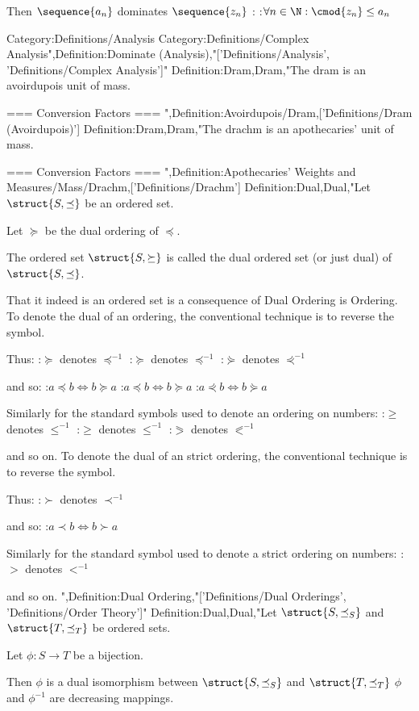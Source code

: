 Then $\sequence {a_n}$ dominates $\sequence {z_n}$ :
:$\forall n \in \N: \cmod {z_n} \le a_n$

Category:Definitions/Analysis
Category:Definitions/Complex Analysis",Definition:Dominate (Analysis),"['Definitions/Analysis', 'Definitions/Complex Analysis']"
Definition:Dram,Dram,"The dram is an avoirdupois unit of mass.

=== Conversion Factors ===
",Definition:Avoirdupois/Dram,['Definitions/Dram (Avoirdupois)']
Definition:Dram,Dram,"The drachm is an apothecaries' unit of mass.

=== Conversion Factors ===
",Definition:Apothecaries' Weights and Measures/Mass/Drachm,['Definitions/Drachm']
Definition:Dual,Dual,"Let $\struct {S, \preceq}$ be an ordered set.

Let $\succeq$ be the dual ordering of $\preceq$.


The ordered set $\struct {S, \succeq}$ is called the dual ordered set (or just dual) of $\struct {S, \preceq}$.


That it indeed is an ordered set is a consequence of Dual Ordering is Ordering.
To denote the dual of an ordering, the conventional technique is to reverse the symbol.

Thus:
:$\succeq$ denotes $\preceq^{-1}$
:$\succcurlyeq$ denotes $\preccurlyeq^{-1}$
:$\curlyeqsucc$ denotes $\curlyeqprec^{-1}$

and so:
:$a \preceq b \iff b \succeq a$
:$a \preccurlyeq b \iff b \succcurlyeq a$
:$a \curlyeqprec b \iff b \curlyeqsucc a$


Similarly for the standard symbols used to denote an ordering on numbers:
:$\ge$ denotes $\le^{-1}$
:$\geqslant$ denotes $\leqslant^{-1}$
:$\eqslantgtr$ denotes $\eqslantless^{-1}$

and so on.
To denote the dual of an strict ordering, the conventional technique is to reverse the symbol.

Thus:
:$\succ$ denotes $\prec^{-1}$

and so:
:$a \prec b \iff b \succ a$


Similarly for the standard symbol used to denote a strict ordering on numbers:
:$>$ denotes $<^{-1}$

and so on.
",Definition:Dual Ordering,"['Definitions/Dual Orderings', 'Definitions/Order Theory']"
Definition:Dual,Dual,"Let $\struct {S, \preceq_S}$ and $\struct {T, \preceq_T}$ be ordered sets.

Let $\phi: S \to T$ be a bijection.


Then $\phi$ is a dual isomorphism between $\struct {S, \preceq_S}$ and $\struct {T, \preceq_T}$  $\phi$ and $\phi^{-1}$ are decreasing mappings.


